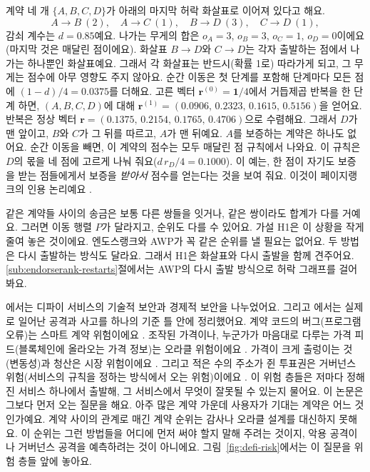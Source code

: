 계약 네 개 $\{A,B,C,D\}$가 아래의 마지막 허락 화살표로 이어져 있다고 해요.
\[
A\to B\ (2),\quad A\to C\ (1),\quad B\to D\ (3),\quad C\to D\ (1),
\]
감쇠 계수는 $d=0.85$예요. 나가는 무게의 합은 $o_A=3$, $o_B=3$, $o_C=1$, $o_D=0$이에요(마지막 것은 매달린 점이에요). 화살표 $B\to D$와 $C\to D$는 각자 출발하는 점에서 나가는 하나뿐인 화살표예요. 그래서 각 화살표는 반드시(확률 1로) 따라가게 되고, 그 무게는 점수에 아무 영향도 주지 않아요. 순간 이동은 첫 단계를 포함해 단계마다 모든 점에 $(1-d)/4=0.0375$를 더해요. 고른 벡터 $\mathbf{r}^{(0)}=\mathbf{1}/4$에서 거듭제곱 반복을 한 단계 하면, $(A,B,C,D)$에 대해 $\mathbf{r}^{(1)}=(0.0906,\,0.2323,\,0.1615,\,0.5156)$을 얻어요. 반복은 정상 벡터 $\mathbf{r}=(0.1375,\,0.2154,\,0.1765,\,0.4706)$으로 수렴해요. 그래서 $D$가 맨 앞이고, $B$와 $C$가 그 뒤를 따르고, $A$가 맨 뒤예요. $A$를 보증하는 계약은 하나도 없어요. 순간 이동을 빼면, 이 계약의 점수는 모두 매달린 점 규칙에서 나와요. 이 규칙은 $D$의 몫을 네 점에 고르게 나눠 줘요($d\,r_D/4=0.1000$). 이 예는, 한 점이 자기도 보증을 받는 점들에게서 보증을 \emph{받아서} 점수를 얻는다는 것을 보여 줘요. 이것이 페이지랭크의 인용 논리예요 \parencite{page1999pagerank}.

같은 계약들 사이의 송금은 보통 다른 쌍들을 잇거나, 같은 쌍이라도 합계가 다를 거예요. 그러면 이동 행렬 $P$가 달라지고, 순위도 다를 수 있어요. 가설 H1은 이 상황을 작게 줄여 놓은 것이에요. 엔도스랭크와 AWP가 꼭 같은 순위를 낼 필요는 없어요. 두 방법은 다시 출발하는 방식도 달라요. 그래서 H1은 화살표와 다시 출발을 함께 견주어요. \ref{sub:endorserank-restarts}절에서는 AWP의 다시 출발 방식으로 허락 그래프를 걸어 봐요.


\textcite{werner2022sok}에서는 디파이 서비스의 기술적 보안과 경제적 보안을 나누었어요. 그리고 \textcite{zhou2023sok}에서는 실제로 일어난 공격과 사고를 하나의 기준 틀 안에 정리했어요. 계약 코드의 버그(프로그램 오류)는 스마트 계약 위험이에요 \parencite{li2022defisecurity}. 조작된 가격이나, 누군가가 마음대로 다루는 가격 피드(블록체인에 올라오는 가격 정보)는 오라클 위험이에요 \parencite{angeris2020oracles}. 가격이 크게 출렁이는 것(변동성)과 청산은 시장 위험이에요 \parencite{perez2021liquidations}. 그리고 적은 수의 주소가 쥔 투표권은 거버넌스 위험(서비스의 규칙을 정하는 방식에서 오는 위험)이에요 \parencite{fritsch2024voting}. 이 위험 층들은 저마다 정해진 서비스 하나에서 출발해, 그 서비스에서 무엇이 잘못될 수 있는지 물어요. 이 논문은 그보다 먼저 오는 질문을 해요. 아주 많은 계약 가운데 사용자가 기대는 계약은 어느 것인가예요. 계약 사이의 관계로 매긴 계약 순위는 감사나 오라클 설계를 대신하지 못해요. 이 순위는 그런 방법들을 어디에 먼저 써야 할지 말해 주려는 것이지, 악용 공격이나 거버넌스 공격을 예측하려는 것이 아니에요. 그림~\ref{fig:defi-risk}에서는 이 질문을 위험 층들 앞에 놓아요.

